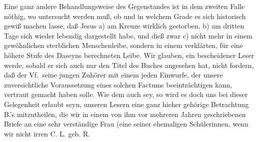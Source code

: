 Eine ganz andere Behandlungsweise des Gegenstandes ist in dem zweiten Falle nöthig, wo untersucht werden muß, ob und in welchem Grade es sich historisch gewiß machen lasse, daß Jesus a) am Kreuze wirklich gestorben, b) am dritten Tage sich wieder lebendig dargestellt habe, und dieß zwar c) nicht mehr in einem gewöhnlichen sterblichen Menschenleibe, sondern in einem verklärten, für eine höhere Stufe des Daseyns berechneten Leibe. Wir glauben, ein bescheidener Leser werde, sobald er sich auch nur den Titel des Buches angesehen hat, nicht fordern, daß der Vf.\ seine jungen Zuhörer mit einem jeden Einwurfe, der unsere zuversichtliche Voraussetzung eines solchen Factums beeinträchtigen kann, vertraut gemacht haben solle. Wie dem auch sey, so wird es doch uns bei dieser Gelegenheit erlaubt seyn, unseren Lesern eine ganz hieher gehörige Betrachtung B.'s mitzutheilen, die wir in einem von ihm vor mehreren Jahren geschriebenen Briefe an eine sehr verständige Frau (eine seiner ehemaligen Schülerinnen, wenn wir nicht irren C. L. geb. R.\editorischeanmerkung{%
}
